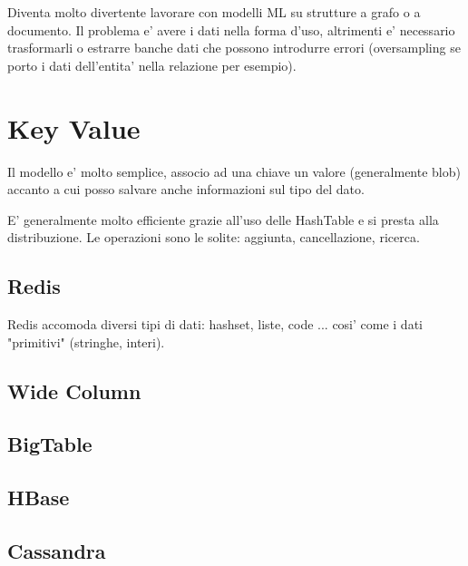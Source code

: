 

Diventa molto divertente lavorare con modelli ML su strutture a grafo o a documento. Il problema e' avere i dati nella forma d'uso, altrimenti e' necessario trasformarli o estrarre banche dati che possono introdurre errori (oversampling se porto i dati dell'entita' nella relazione per esempio).

\section{Key Value}

Il modello e' molto semplice, associo ad una chiave un valore (generalmente blob) accanto a cui posso salvare anche informazioni sul tipo del dato.


E' generalmente molto efficiente grazie all'uso delle HashTable e si presta alla distribuzione. Le operazioni sono le solite: aggiunta, cancellazione, ricerca.

\subsection{Redis}

Redis accomoda diversi tipi di dati: hashset, liste, code ... cosi' come i dati "primitivi" (stringhe, interi).



\subsection{Wide Column}

\subsection{BigTable}

\subsection{HBase}

\subsection{Cassandra}
